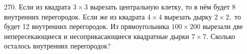 270. Если из квадрата $3\times3$ вырезать центральную клетку, то в нём будет 8 внутренних перегородок. Если же из квадрата $4\times4$ вырезать дырку $2\times2,$ то будет 12 внутренних перегородок. Из прямоугольника $100\times200$ вырезали две непересекающиеся и несоприкасающиеся квадратные дырки $7\times7.$ Сколько осталось внутренних перегородок?\\
